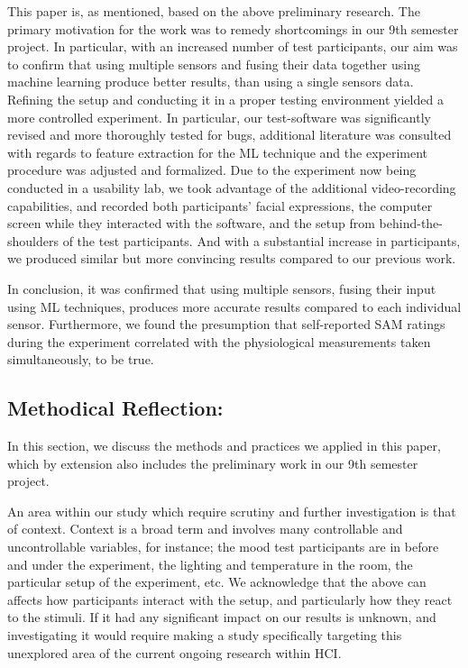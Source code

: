 This paper is, as mentioned, based on the above preliminary research. The
primary motivation for the work was to remedy shortcomings in our 9th semester
project. In particular, with an increased number of test participants, our aim
was to confirm that using multiple sensors and fusing their data together using machine learning produce better results, than using a single sensors data. Refining the
setup and conducting it in a proper testing environment yielded a more
controlled experiment. In particular, our test-software was significantly
revised and more thoroughly tested for bugs, additional literature was consulted
with regards to feature extraction for the ML technique and the experiment procedure was
adjusted and formalized. Due to the experiment now being conducted in a
usability lab, we took advantage of the additional video-recording capabilities,
and recorded both participants' facial expressions, the computer screen while
they interacted with the software, and the setup from behind-the-shoulders of
the test participants. And with a substantial increase in participants, we
produced similar but more convincing results compared to our previous work.

In conclusion, it was confirmed that using multiple sensors, fusing their input
using ML techniques, produces more accurate results compared to each individual
sensor. Furthermore, we found the presumption that self-reported SAM ratings
during the experiment correlated with the physiological measurements taken
simultaneously, to be true.

\subsection{Methodical Reflection:}
In this section, we discuss the methods and practices we applied in this paper,
which by extension also includes the preliminary work in our 9th semester
project.

An area within our study which require scrutiny and further investigation is
that of context. Context is a broad term and involves many controllable and
uncontrollable variables, for instance; the mood test participants are in
before and under the experiment, the lighting and temperature in the room, the
particular setup of the experiment, etc. We acknowledge that the above can
affects how participants interact with the setup, and particularly how they
react to the stimuli. If it had any significant impact on our results is
unknown, and investigating it would require making a study specifically targeting this unexplored area of the current ongoing research within HCI.

